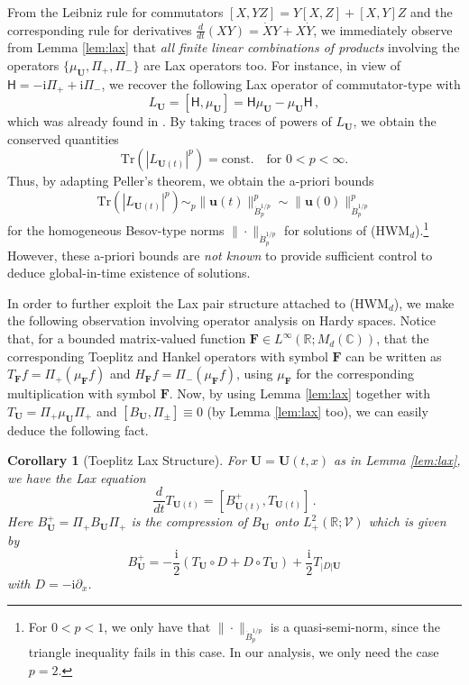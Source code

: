 \documentclass[11pt,reqno]{amsart}
\newtheorem{cor}{Corollary}[section]
\theoremstyle{definition}
\theoremstyle{remark}
\theoremstyle{remark}
\numberwithin{equation}{section}
\newcommand{\C}{\mathbb{C}}
\newcommand{\R}{\mathbb{R}}
\newcommand{\VV}{\mathcal{V}}
\newcommand{\pt}{\partial}
\newcommand{\ii}{\mathrm{i}}
\newcommand{\Hil}{\mathsf{H}}
\newcommand{\uu}{\mathbf{u}}
\newcommand{\Ub}{\mathbf{U}}
\newcommand{\Fb}{\mathbf{F}}
\newcommand{\Tr}{\mathrm{Tr}}
\begin{document}
From the Leibniz rule for commutators $[X,YZ]=Y[X,Z] + [X,Y]Z$ and the corresponding rule for derivatives $\frac{d}{dt} (XY) = \dot{X}Y+ X \dot{Y}$,  we immediately observe from Lemma \ref{lem:lax} that {\em all finite linear combinations of products} involving the operators $\{ \mu_\Ub, \Pi_+, \Pi_- \}$ are Lax operators too. For instance, in view of $\Hil = -\ii \Pi_+ + \ii \Pi_-$,  we recover the following Lax operator of commutator-type with
$$
L_{\Ub} = [\Hil, \mu_\Ub]  = \Hil \mu_\Ub - \mu_\Ub \Hil  \, ,
$$
which was already found in \cite{GeLe-18}. By taking traces of powers of $L_\Ub$, we obtain the  conserved quantities
$$
\Tr(|L_{\Ub(t)}|^p) = \mbox{const.} \quad \mbox{for $0 < p < \infty$}.
$$
Thus, by adapting Peller's theorem, we obtain the a-priori bounds
$$
\Tr(|L_{\Ub(t)}|^p) \sim_p \| \uu(t) \|_{\dot{B}^{1/p}_{p}}^p \sim \| \uu(0) \|_{\dot{B}^{1/p}_p}^p 
$$
for the homogeneous Besov-type norms $\| \cdot \|_{\dot{B}^{1/p}_p}$ for solutions of (HWM$_d$).\footnote{For $0 < p < 1$, we only have that $\| \cdot \|_{\dot{B}^{1/p}_p}$ is a quasi-semi-norm, since the triangle inequality fails in this case. In our analysis, we only need the case $p=2$.} However, these a-priori bounds are  {\em not known} to provide sufficient control to deduce global-in-time existence of solutions.

In order to further exploit the Lax pair structure attached to (HWM$_d$), we make the following observation involving operator analysis on Hardy spaces. Notice that, for a bounded matrix-valued function $\mathbf{F} \in L^\infty(\R; M_d(\C))$, that the corresponding Toeplitz and Hankel operators with symbol $\Fb$ can be written as $T_{\mathbf{F}} f = \Pi_+ (\mu_\mathbf{F} f)$ and $H_{\mathbf{F}} f = \Pi_- (\mu_{\mathbf{F}} f)$, using $\mu_{\mathbf{F}}$ for the corresponding multiplication with symbol $\mathbf{F}$. Now, by using Lemma \ref{lem:lax} together with $T_{\Ub} = \Pi_+ \mu_{\Ub} \Pi_+$ and $[B_\Ub, \Pi_{\pm}] \equiv 0$ (by Lemma \ref{lem:lax} too), we can easily deduce the following fact.


\begin{cor}[Toeplitz Lax Structure] \label{cor:toep_hank_lax}
For $\Ub=\Ub(t,x)$ as in Lemma \ref{lem:lax}, we have the Lax equation
$$
\frac{d}{dt} T_{\Ub(t)} = \left [ B^+_{\Ub(t)}, T_{\Ub(t)} \right ] \, .
$$
Here $B^+_{\Ub} = \Pi_+ B_{\Ub} \Pi_+$ is the compression of $B_\Ub$ onto $L^2_+(\R;\VV)$ which is given by
$$
B^+_\Ub = -\frac{\ii}{2} ( T_{\Ub}  \circ D + D \circ T_{\Ub} ) + \frac{\ii}{2} T_{|D| \Ub}  
$$
with $D=-\ii \pt_x$.
\end{cor}
\end{document}

